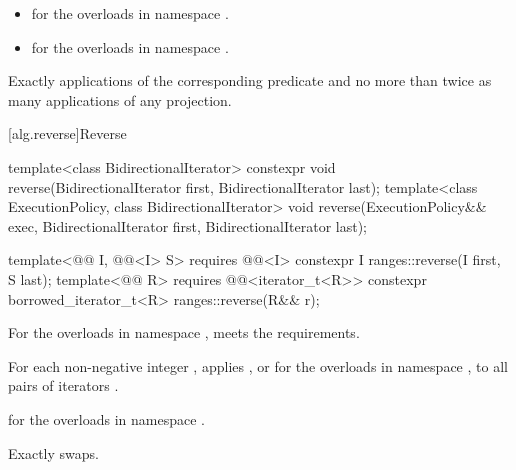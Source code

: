 \begin{itemdescr}
\pnum
\returns
\begin{itemize}
\item {} for the overloads in namespace .
\item {} for the overloads in namespace .
\end{itemize}

\pnum
\complexity
Exactly  applications
of the corresponding predicate
and no more than twice as many applications of any projection.
\end{itemdescr}

[alg.reverse]{Reverse}

%
\begin{itemdecl}
template<class BidirectionalIterator>
  constexpr void reverse(BidirectionalIterator first, BidirectionalIterator last);
template<class ExecutionPolicy, class BidirectionalIterator>
  void reverse(ExecutionPolicy&& exec,
               BidirectionalIterator first, BidirectionalIterator last);

template<@@ I, @@<I> S>
  requires @@<I>
  constexpr I ranges::reverse(I first, S last);
template<@@ R>
  requires @@<iterator_t<R>>
  constexpr borrowed_iterator_t<R> ranges::reverse(R&& r);
\end{itemdecl}

\begin{itemdescr}
\pnum
\expects
For the overloads in namespace ,
 meets
the  requirements.

\pnum
\effects
For each non-negative integer ,
applies , or
 for the overloads in namespace ,
to all pairs of iterators .

\pnum
\returns
{} for the overloads in namespace .

\pnum
\complexity
Exactly  swaps.
\end{itemdescr}

